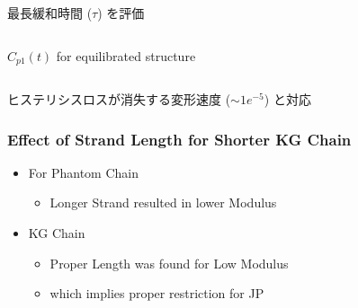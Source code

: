 \documentclass[12pt, dvipdfmx]{beamer}
\begin{document}
\begin{frame}
\begin{exampleblock}{最長緩和時間 ($\tau$) を評価}
\begin{columns}[totalwidth=\linewidth]
					\scriptsize{$C_{p1}(t)$ for equilibrated structure}
		\end{columns}
	\vspace*{2mm}
		\alert{ヒステリシスロスが消失する変形速度 ($\sim 1e^{-5}$) と対応}
	\end{exampleblock}
		
\end{frame}

\begin{frame}
	\frametitle{Effect of Strand Length for Shorter KG Chain}
	\begin{itemize}
		\item For Phantom Chain
		\begin{itemize}
			\item Longer Strand resulted in lower Modulus
		\end{itemize}
		
		\item KG Chain 
		\begin{itemize}
			\item Proper Length was found for Low Modulus
			\item which implies proper restriction for JP
		\end{itemize}
		

\end{itemize}
\end{frame}
\end{document}
